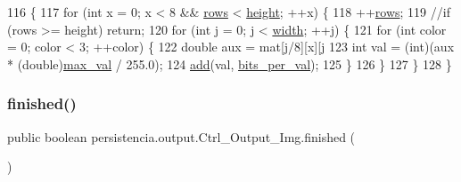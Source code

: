 \begin{DoxyCode}
116     \{
117         \textcolor{keywordflow}{for} (\textcolor{keywordtype}{int} x = 0; x < 8 && \hyperlink{classpersistencia_1_1output_1_1Ctrl__Output__Img_a586ee8128a26b6786471e040a705bdbc}{rows} < \hyperlink{classpersistencia_1_1output_1_1Ctrl__Output__Img_a1d7bc52c64c79e8545ae6d1ae8b9ee2e}{height}; ++x) \{
118             ++\hyperlink{classpersistencia_1_1output_1_1Ctrl__Output__Img_a586ee8128a26b6786471e040a705bdbc}{rows};
119             \textcolor{comment}{//if (rows >= height) return;}
120             \textcolor{keywordflow}{for} (\textcolor{keywordtype}{int} j = 0; j < \hyperlink{classpersistencia_1_1output_1_1Ctrl__Output__Img_ae4a01ec459078cece4815d2fe7db8a64}{width}; ++j) \{
121                 \textcolor{keywordflow}{for} (\textcolor{keywordtype}{int} color = 0; color < 3; ++color) \{
122                     \textcolor{keywordtype}{double} aux = mat[j/8][x][j%
123                     \textcolor{keywordtype}{int} val = (int)(aux * (\textcolor{keywordtype}{double})\hyperlink{classpersistencia_1_1output_1_1Ctrl__Output__Img_ab9e685dae026afe43188c62d7c4fad53}{max\_val} / 255.0);
124                     \hyperlink{classpersistencia_1_1output_1_1Ctrl__Output__Img_a305a977f4d4b999cf65e14e7106b6c5e}{add}(val, \hyperlink{classpersistencia_1_1output_1_1Ctrl__Output__Img_ad40e63d16abd9058889249f5ad84f200}{bits\_per\_val});
125                 \}
126             \}
127         \}
128     \}
\end{DoxyCode}
\mbox{\label{classpersistencia_1_1output_1_1Ctrl__Output__Img_a365d043ee5bd08c4e470bff468773552}} 
\subsubsection{\texorpdfstring{finished()}{finished()}}
{\footnotesize\ttfamily public boolean persistencia.\+output.\+Ctrl\+\_\+\+Output\+\_\+\+Img.\+finished (\begin{DoxyParamCaption}{ }\end{DoxyParamCaption})\hspace{0.3cm}{\ttfamily [inline]}}



